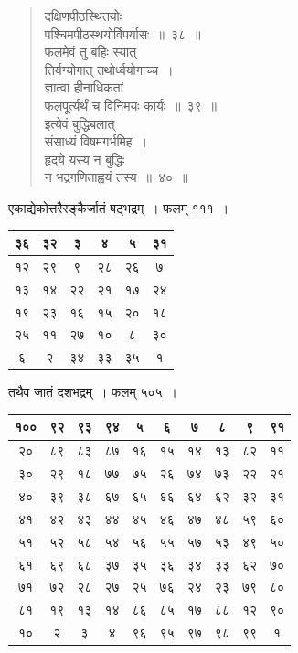 \documentclass[11pt, openany]{book}
\begin{document}
\newpage

\begin{quote}
{\gk दक्षिणपीठस्थितयोः\\
पश्चिमपीठस्थयोर्विपर्यासः~॥~३८~॥\\
फलमेवं तु बहिः स्यात्\\
तिर्यग्योगात् तथोर्ध्वयोगाच्च~।\\
ज्ञात्वा हीनाधिकतां\\
फलपूर्त्यर्थं च विनिमयः कार्यः~॥~३९~॥\\
इत्येवं बुद्धिबलात्\\
संसाध्यं विषमगर्भमिह~।\\
हृदये यस्य न बुद्धिः\\
न भद्रगणिताह्वयं तस्य~॥~४०~॥	}
\end{quote}

एकाद्येकोत्तरैरङ्कैर्जातं षट्भद्रम्~। फलम् १११~।
\begin{table}[h]
	\centering
	\setlength{\extrarowheight}{2pt} \setlength{\tabcolsep}{2pt}
	\begin{tabular}{|c|c|c|c|c|c|}
		\hline
	३६		& ३२ &  ३ & ४ & ५ & ३१\\
		\hline
		१२ & २९ & ९ & २८ & २६ & ७ \\
		\hline
		१३ & १४ & २२ & २१ & १७ & २४\\
		\hline
		१९ & २३ & १६ & १५ & २० & १८\\
		\hline
		२५ & ११ & २७ & १० & ८ & ३० \\
		\hline
		६ & २ & ३४ & ३३ & ३५ & १\\
		\hline
	\end{tabular}\qquad
\end{table}

\newpage

तथैव जातं दशभद्रम्~। फलम् ५०५~।

\begin{table}[h]
	\centering
\begin{tabular}{|c|c|c|c|c|c|c|c|c|c|}
\hline
१०० & ९२ & ९३ & ९४ & ५ & ६ & ७ & ८ & ९ & ९१ \\
\hline 
२० & ८९ & ८३ & ८७ & १६ & १५ & १४ & १३ & ८२ & ११\\
\hline
 ३० & २९ & १८ & ७७ & ७५ & २६ & ७४ & ७३ & २२ & २१ \\
 \hline
 ४० & ३९ &  ३८ & ६७ & ६५ & ६६ & ६४ & ६२ & ३२ & ३१\\
 \hline
 ४१ & ४२ & ४३ & ४४ & ४५ & ४६ & ४७ & ४८  & ५९ & ६०\\
 \hline
 ५१ & ५२ & ५८ & ५४ & ५६ & ५५ & ५७ & ५३ & ४९ & ५०\\
 \hline
 ६१ & ६९ & ६८ & ३७ & ३५ & ३६ & ३४ & ३३ & ६२ & ७०\\
 \hline
 ७१ & ७२ & २८ & २७ & २५ & ७६ & २४ & २३ & ७९ & ८०\\
 \hline
 ८१ & १९ & १३ & १४ & ८६ & ८५ & १७ & ८८ & १२ & ९० \\
 \hline
 १० & २ & ३ & ४ & ९६ & ९५ & ९७ & ९८ & ९९ & १\\
 \hline
 \end{tabular}
\end{table}
\end{document}
